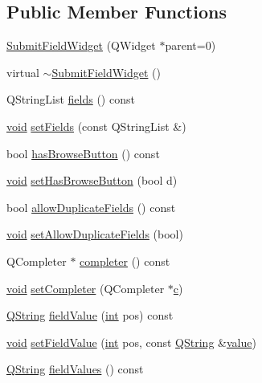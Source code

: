 \subsection*{Public Member Functions}
\begin{DoxyCompactItemize}
\item 
\hyperlink{class_utils_1_1_submit_field_widget_a5c94b205b129aa2e13380f50613c1219}{Submit\-Field\-Widget} (Q\-Widget $\ast$parent=0)
\item 
virtual \hyperlink{class_utils_1_1_submit_field_widget_a70d97293a17e22f06a730e18b95518e0}{$\sim$\-Submit\-Field\-Widget} ()
\item 
Q\-String\-List \hyperlink{class_utils_1_1_submit_field_widget_a1d6fd4fe2919c099e5cb7e4a85e4b3af}{fields} () const 
\item 
\hyperlink{group___u_a_v_objects_plugin_ga444cf2ff3f0ecbe028adce838d373f5c}{void} \hyperlink{class_utils_1_1_submit_field_widget_a5cc81b5b6aca524b7e3668c519719ee1}{set\-Fields} (const Q\-String\-List \&)
\item 
bool \hyperlink{class_utils_1_1_submit_field_widget_af634ec674af941e50bfb46ef816aa251}{has\-Browse\-Button} () const 
\item 
\hyperlink{group___u_a_v_objects_plugin_ga444cf2ff3f0ecbe028adce838d373f5c}{void} \hyperlink{class_utils_1_1_submit_field_widget_a5b332d77afb3bb77d57a744805dd02b1}{set\-Has\-Browse\-Button} (bool d)
\item 
bool \hyperlink{class_utils_1_1_submit_field_widget_ac3e509c0a1f442d378434953b365e707}{allow\-Duplicate\-Fields} () const 
\item 
\hyperlink{group___u_a_v_objects_plugin_ga444cf2ff3f0ecbe028adce838d373f5c}{void} \hyperlink{class_utils_1_1_submit_field_widget_a8cc8d00f25687d8fc526bb66ddde5620}{set\-Allow\-Duplicate\-Fields} (bool)
\item 
Q\-Completer $\ast$ \hyperlink{class_utils_1_1_submit_field_widget_ab11b596a4e9e831bb1090febdf0e1324}{completer} () const 
\item 
\hyperlink{group___u_a_v_objects_plugin_ga444cf2ff3f0ecbe028adce838d373f5c}{void} \hyperlink{class_utils_1_1_submit_field_widget_ac40d3d639f21ed3f2c1a364578529b11}{set\-Completer} (Q\-Completer $\ast$\hyperlink{glext_8h_a1f2d7f8147412c43ba2303a56f97ee73}{c})
\item 
\hyperlink{group___u_a_v_objects_plugin_gab9d252f49c333c94a72f97ce3105a32d}{Q\-String} \hyperlink{class_utils_1_1_submit_field_widget_a9085ebdc78107f7973721f890706dfd1}{field\-Value} (\hyperlink{ioapi_8h_a787fa3cf048117ba7123753c1e74fcd6}{int} pos) const 
\item 
\hyperlink{group___u_a_v_objects_plugin_ga444cf2ff3f0ecbe028adce838d373f5c}{void} \hyperlink{class_utils_1_1_submit_field_widget_afad7e57d164b4398e7d0b4783c93a543}{set\-Field\-Value} (\hyperlink{ioapi_8h_a787fa3cf048117ba7123753c1e74fcd6}{int} pos, const \hyperlink{group___u_a_v_objects_plugin_gab9d252f49c333c94a72f97ce3105a32d}{Q\-String} \&\hyperlink{glext_8h_aa0e2e9cea7f208d28acda0480144beb0}{value})
\item 
\hyperlink{group___u_a_v_objects_plugin_gab9d252f49c333c94a72f97ce3105a32d}{Q\-String} \hyperlink{class_utils_1_1_submit_field_widget_a7008903646d9ebac6e100dbc5434c55e}{field\-Values} () const 
\end{DoxyCompactItemize}
